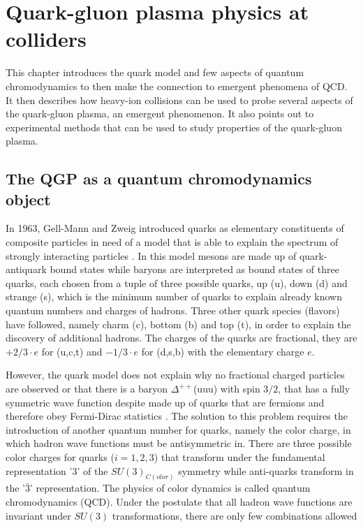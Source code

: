 \documentclass[
  a4paper,
  12pt,
  oneside,
  parskip=half,
  listof=totoc,
  bibliography=totoc,
  DIV=12,
  numbers=noenddot,
  BA.tex
  ]{subfiles}
\begin{document}
\section{Quark-gluon plasma physics at colliders}

This chapter introduces the quark model and few aspects of quantum chromodynamics to then make the connection to emergent phenomena of QCD. It then describes how heavy-ion collisions can be used to probe several aspects of the quark-gluon plasma, an emergent phenomenon. It also points out to experimental methods that can be used to study properties of the quark-gluon plasma. 

\subsection{The QGP as a quantum chromodynamics object}
In 1963, Gell-Mann and Zweig introduced quarks as elementary constituents of composite particles in need of a model that is able to explain the spectrum of strongly interacting particles \cite{peskin_introduction_2018}. In this model mesons are made up of quark-antiquark bound states while baryons are interpreted as bound states of three quarks, each chosen from a tuple of three possible quarks, up (u), down (d) and strange (s), which is the minimum number of quarks to explain already known quantum numbers and charges of hadrons. Three other quark species (flavors) have followed, namely charm (c), bottom (b) and top (t), in order to explain the discovery of additional hadrons. The charges of the quarks are fractional, they are $+2/3 \cdot e$ for (u,c,t) and $-1/3 \cdot e$ for (d,s,b) with the elementary charge $e$.

However, the quark model does not explain why no fractional charged particles are observed or that there is a baryon $\Delta^{++}$(uuu) with spin $3/2$, that has a fully symmetric wave function despite made up of quarks that are fermions and therefore obey Fermi-Dirac statistics \cite{peskin_introduction_2018}. The solution to this problem requires the introduction of another quantum number for quarks, namely the color charge, in which hadron wave functions must be antisymmetric in. There are three possible color charges for quarks ($i = 1,2,3$) that transform under the fundamental representation '$3$' of the $SU(3)_{C(olor)}$ symmetry while anti-quarks transform in the '$\bar{3}$' representation. The physics of color dynamics is called quantum chromodynamics (QCD). Under the postulate that all hadron wave functions are invariant under $SU(3)$ transformations, there are only few combinations allowed
\end{document}
